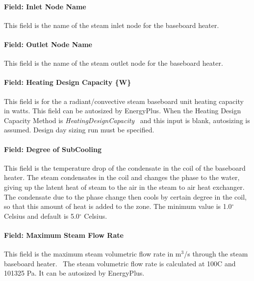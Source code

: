 \paragraph{Field: Inlet Node Name}\label{field-inlet-node-name-1-003}

This field is the name of the steam inlet node for the baseboard heater.

\paragraph{Field: Outlet Node Name}\label{field-outlet-node-name-1-004}

This field is the name of the steam outlet node for the baseboard heater.

\paragraph{Field: Heating Design Capacity \{W\}}\label{field-heating-design-capacity-w-1-000}

This field is for the a radiant/convective steam baseboard unit heating capacity in watts. This field can be autosized by EnergyPlus. When the Heating Design Capacity Method is \emph{HeatingDesignCapacity}~ and this input is blank, autosizing is assumed. Design day sizing run must be specified.

\paragraph{Field: Degree of SubCooling}\label{field-degree-of-subcooling-000}

This field is the temperature drop of the condensate in the coil of the baseboard heater. The steam condensates in the coil and changes the phase to the water, giving up the latent heat of steam to the air in the steam to air heat exchanger. The condensate due to the phase change then cools by certain degree in the coil, so that this amount of heat is added to the zone. The minimum value is 1.0$^\circ$ Celsius and default is 5.0$^\circ$ Celsius.

\paragraph{Field: Maximum Steam Flow Rate}\label{field-maximum-steam-flow-rate-000}

This field is the maximum steam volumetric flow rate in m\(^{3}\)/s through the steam baseboard heater.~ The steam volumetric flow rate is calculated at 100C and 101325 Pa. It can be autosized by EnergyPlus.

